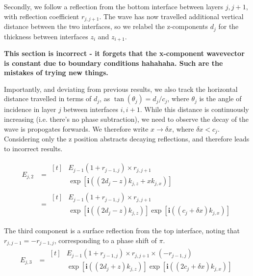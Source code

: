 \documentclass[../main.tex]{subfiles}
\begin{document}
	Secondly, we follow a reflection from the bottom interface between layers $j,j+1$, with reflection coefficient $r_{j,j+1}$. The wave has now travelled additional vertical distance between the two interfaces, so we relabel the z-components $d_{j}$ for the thickness between interfaces $z_i$ and $z_{i+1}$. 
	
	\vspace{1em}
	\textbf{This section is incorrect - it forgets that the x-component wavevector is constant due to boundary conditions hahahaha. Such are the mistakes of trying new things.}
	\vspace{1em}

	Importantly, and deviating from previous results, we also track the horizontal distance travelled in terms of $d_{j}$, as $\tan(\theta_j) = d_{j} / c_{j}$, where $\theta_j$ is the angle of incidence in layer $j$ between interfaces $i, i+1$. While this distance is continuously increasing (i.e. there's no phase subtraction), we need to observe the decay of the wave is propogates forwards. We therefore write $x \to \delta x$, where $\delta x < c_{j}$. Considering only the z position abstracts decaying reflections, and therefore leads to incorrect results.

	\begin{align}
		E_{j,2} &=\begin{aligned}[t]
				&E_{j-1}	
				\left(1 + r_{j-1,j}\right) \times r_{j, j+1} \\
				&\exp\left[\mathbf{i}\left((2 d_{j} - z) k_{j,z} + x k_{j,x}  \right)\right]
			\end{aligned} \\
			&=\begin{aligned}[t]
				&E_{j-1} 
				\left(1 + r_{j-1,j}\right) \times r_{j, j+1}\\
				&\exp\left[\mathbf{i}\left((2 d_{j} - z) k_{j,z}\right)\right]
				\exp\left[\mathbf{i}\left((c_{j} + \delta x) k_{j,x}\right)\right]
			\end{aligned}
	\end{align}

	The third component is a surface reflection from the top interface, noting that $r_{j,j-1} = -r_{j-1,j}$, corresponding to a phase shift of $\pi$.
	\begin{align}
		E_{j,3} &= 
			\begin{aligned}[t]
			&E_{j-1} 
			\left(1 + r_{j-1,j}\right) \times r_{j, j+1} \times (- r_{j-1,j})\\
			&\exp\left[\mathbf{i}\left((2 d_{j} + z) k_{j,z}\right)\right]
			\exp\left[\mathbf{i}\left((2 c_{j} + \delta x) k_{j,x}\right)\right]
			\end{aligned}
	\end{align}
\end{document}
